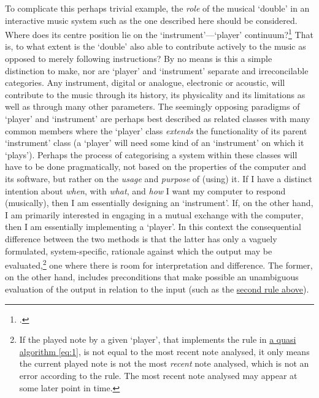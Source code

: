 To  complicate this perhaps trivial example, the \emph{role} of the musical `double' in an interactive music system such as the one described here should be considered. Where does its centre position lie on the `instrument'---`player' continuum?\footcite[For a description of the classification system from which this terminology is borrowed see \autoref{sec:music-pract-inter}. See also][]{rowe01} 
That is, to what extent is the `double' also able to contribute actively to the music as opposed to merely following instructions? By no means is this a simple distinction to make, nor are `player' and `instrument' separate and irreconcilable categories. Any instrument, digital or analogue, electronic or acoustic, will contribute to the music through its history, its physicality and its limitations as well as through many other parameters. The seemingly opposing paradigms of `player' and `instrument' are perhaps best described as related classes with many common members where the `player' class \emph{extends} the functionality of its parent `instrument' class (a `player' will need some kind of an `instrument' on which it  `plays'). Perhaps the process of categorising a system within these classes will have to be done pragmatically, not based on the properties of the computer and its software, but rather on the \emph{usage} and \emph{purpose} of (using) it. If I have a distinct intention about \emph{when}, with \emph{what}, and \emph{how} I want my computer to respond (musically), then I am essentially designing an `instrument'. If, on the other hand, I am primarily interested in engaging in a mutual exchange with the computer, then I am essentially implementing a `player'. In this context the consequential difference between the two methods is that the latter has only a vaguely formulated, system-specific, rationale against which the output may be evaluated,\footnote{If the played note by a given `player', that implements the rule in \hyperlink{eq:human-comp-inter:1}{a quasi algorithm \eqref{eq:1}}, is not equal to the most recent note analysed, it only means the current played note is not the most \emph{recent} note analysed, which is not an error according to the rule. The most recent note analysed may appear at some later point in time.} one where there is room for interpretation and difference. The former, on the other hand, includes preconditions that make possible an unambiguous evaluation of the output in relation to the input (such as the \hyperlink{eq:human-comp-inter:2}{second rule above}).


